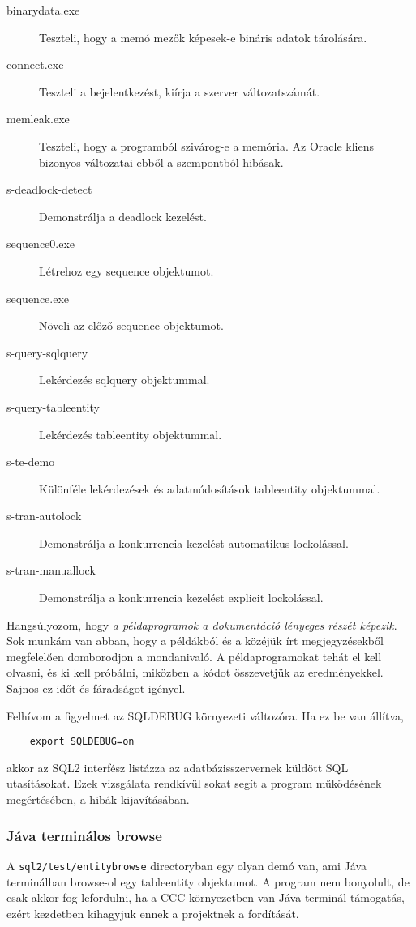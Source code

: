 \begin{description}
\item[binarydata.exe]
    Teszteli, hogy a memó mezők képesek-e bináris adatok tárolására.
\item[connect.exe]
    Teszteli a bejelentkezést, kiírja a szerver változatszámát.
\item[memleak.exe]
    Teszteli, hogy a programból szivárog-e a memória. 
    Az Oracle kliens bizonyos változatai ebből a szempontból hibásak.
\item[s-deadlock-detect]
    Demonstrálja a deadlock kezelést.
\item[sequence0.exe]
    Létrehoz egy sequence objektumot.
\item[sequence.exe]
    Növeli az előző sequence objektumot.
\item[s-query-sqlquery]
    Lekérdezés sqlquery objektummal.
\item[s-query-tableentity]
    Lekérdezés tableentity objektummal.
\item[s-te-demo]
    Különféle lekérdezések és adatmódosítások tableentity objektummal.
\item[s-tran-autolock]
    Demonstrálja a konkurrencia kezelést automatikus lockolással.
\item[s-tran-manuallock]
    Demonstrálja a konkurrencia kezelést explicit lockolással.
\end{description}

Hangsúlyozom, hogy {\em a példaprogramok a dokumentáció
lényeges részét képezik}. Sok munkám van abban, hogy a példákból
és a közéjük írt megjegyzésekből megfelelően domborodjon a mondanivaló. 
A példaprogramokat tehát el kell olvasni, és ki kell próbálni, 
miközben a kódot összevetjük az eredményekkel. Sajnos ez időt 
és fáradságot igényel.

Felhívom a figyelmet az SQLDEBUG környezeti változóra.
Ha ez be van állítva,
\begin{verbatim}
    export SQLDEBUG=on
\end{verbatim}
akkor az SQL2 interfész listázza az adatbázisszervernek küldött
SQL utasításokat. Ezek vizsgálata rendkívül sokat segít a program
működésének megértésében, a hibák kijavításában.

\subsubsection*{Jáva terminálos browse}

A \verb!sql2/test/entitybrowse! directoryban egy olyan demó van,
ami Jáva terminálban browse-ol egy tableentity objektumot.
A program nem bonyolult, de csak akkor fog lefordulni,
ha a CCC környezetben van Jáva terminál támogatás,
ezért kezdetben kihagyjuk ennek a projektnek a fordítását.



 






